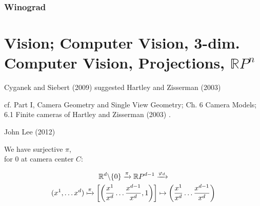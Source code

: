 \documentclass[10pt]{amsart}
\begin{document}
\begin{multicols*}{2}
\section{Winograd}  






\part{Vision; Computer Vision, 3-dim. Computer Vision, Projections, $\mathbb{R}P^n$}

Cyganek and Siebert (2009) \cite{CySi2009} suggested Hartley and Zisserman (2003) \cite{HaZi2003}

cf. Part I, Camera Geometry and Single View Geometry; Ch. 6 Camera Models; 6.1 Finite cameras of Hartley and Zisserman (2003) \cite{HaZi2003}.  

John Lee (2012) \cite{JLee2012}


We have surjective $\pi$, \\
for $0$ at camera center $C$:  

\begin{equation}
\begin{gathered}
	\mathbb{R}^d \backslash \lbrace 0 \rbrace \xrightarrow{ \pi } \mathbb{R}P^{d-1}  \xrightarrow{ \varphi_d } \\
	(x^1 , \dots x^d) \xmapsto{ \pi } \left[ \left( \frac{x^1}{x^d} \dots \frac{x^{d-1}}{x^d} , 1 \right) \right] \mapsto \left( \frac{x^1}{x^d} \dots \frac{x^{d-1}}{x^d} \right) 
\end{gathered}
\end{equation}


\end{multicols*}
\end{document}
